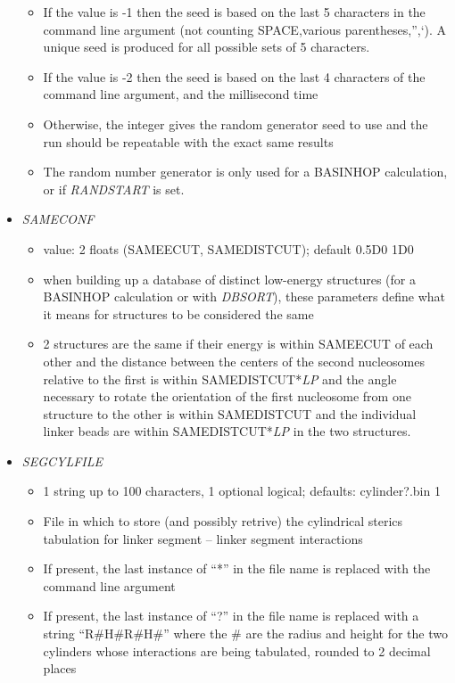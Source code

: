 \documentclass[12pt,dvips]{article}
\begin{document}
\begin{itemize}
\begin{itemize}
    \item If the value is -1 then the seed is based on the last 5 characters in the command line argument (not counting SPACE,various parentheses,'',`). A unique seed is produced for all possible sets of 5 characters. 
    \item If the value is -2 then the seed is based on the last 4 characters of the command line argument, and the millisecond time
    \item Otherwise, the integer gives the random generator seed to use and the run should be repeatable with the exact same results
    \item The random number generator is only used for a BASINHOP calculation, or if {\em RANDSTART} is set.
  \end{itemize}
%
\item {\it SAMECONF}
  \begin{itemize}
    \item value: 2 floats (SAMEECUT, SAMEDISTCUT); default 0.5D0 1D0
    \item when building up a database of distinct low-energy structures (for a BASINHOP calculation or with {\em DBSORT}), these parameters define what it means for structures to be considered the same
    \item 2 structures are the same if their energy is within SAMEECUT of each other and the distance between the centers of the second nucleosomes relative to the first is within SAMEDISTCUT*{\em LP} and the angle necessary to rotate the orientation of the first nucleosome from one structure to the other is within SAMEDISTCUT and the individual linker beads are within SAMEDISTCUT*{\em LP} in the two structures.
  \end{itemize}
%
\item {\it SEGCYLFILE}
  \begin{itemize}
    \item 1 string up to 100 characters, 1 optional logical; defaults: cylinder?.bin 1
    \item File in which to store (and possibly retrive) the cylindrical sterics tabulation for linker segment -- linker segment interactions
    \item If present, the last instance of ``*'' in the file name is replaced with the command line argument
    \item If present, the last instance of ``?''  in the file name is replaced with a string ``R\#H\#R\#H\#'' where the \# are the radius and height for the two cylinders whose interactions are being tabulated, rounded to 2 decimal places

\end{itemize}
\end{itemize}
\end{document}
